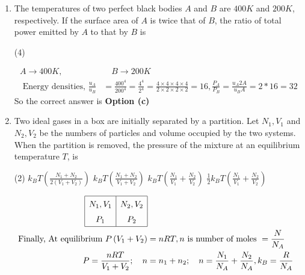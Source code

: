 \begin{enumerate}
\begin{answer}
\end{answer}
\item  The temperatures of two perfect black bodies $A$ and $B$ are $400 K$ and $200 K$, respectively. If the surface area of $A$ is twice that of $B$, the ratio of total power emitted by $A$ to that by $B$ is
 \begin{tasks}(4)
\end{tasks}
\begin{answer}
	\begin{align*}
	A \rightarrow 400 K, &\quad B \rightarrow 200 K\\
	\text { Energy densities, } \frac{u_{A}}{u_{B}}&=\frac{400^{4}}{200^{4}}=\frac{4^{4}}{2^{4}}=\frac{4 \times 4 \times 4 \times 4}{2 \times 2 \times 2 \times 2}=16, \frac{P_{A}}{P_{B}}=\frac{u_{A} 2 A}{u_{B} A}=2 * 16=32
	\end{align*}
	So the correct answer is \textbf{Option (c)}
\end{answer}
\item Two ideal gases in a box are initially separated by a partition. Let $N_{1}, V_{1}$ and $N_{2}, V_{2}$ be the numbers of particles and volume occupied by the two systems. When the partition is removed, the pressure of the mixture at an equilibrium temperature $T$, is
 \begin{tasks}(2)
	\task[\textbf{a.}]$k_{B} T\left(\frac{N_{1}+N_{2}}{2\left(V_{1}+V_{2}\right)}\right)$
	\task[\textbf{b.}]$k_{B} T\left(\frac{N_{1}+N_{2}}{V_{1}+V_{2}}\right)$
	\task[\textbf{c.}]$k_{B} T\left(\frac{N_{1}}{V_{1}}+\frac{N_{2}}{V_{2}}\right)$
	\task[\textbf{d.}] $\frac{1}{2} k_{B} T\left(\frac{N_{1}}{V_{1}}+\frac{N_{2}}{V_{2}}\right)$
\end{tasks}
\begin{answer}
	\begin{align*}
	\renewcommand*{\arraystretch}{1.5}
	\begin{array}{|c|c|}
	\hline N_{1}, V_{1} & N_{2}, V_{2} \\
	P_{1} & P_{2} \\
	\hline
	\end{array}\\
\text{	Finally, At equilibrium }P\left(V_{1}+V_{2}\right)&=n R T, n\text{ is number of moles }=\frac{N}{N_{A}}\\
	P=\frac{n R T}{V_{1}+V_{2}} ; \quad n&=n_{1}+n_{2} ; \quad n=\frac{N_{1}}{N_{A}}+\frac{N_{2}}{N_{A}}, k_{B}=\frac{R}{N_{A}} \\

\end{align*}
\end{answer}
\end{enumerate}
